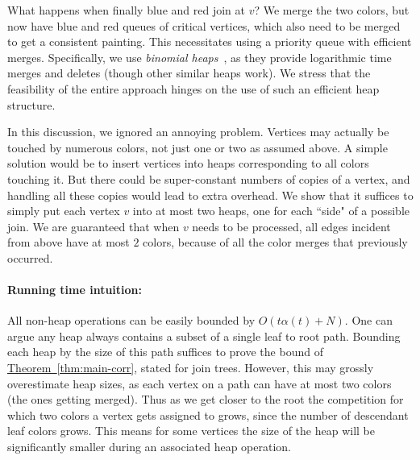 \documentclass[11pt]{article}
\newcommand{\myparagraph}[1]{\paragraph{#1}}
\theoremstyle{definition}
\newcommand{\Thm}[1]{\hyperref[thm:#1]{Theorem~\ref*{thm:#1}}} %
\begin{document}
What happens when finally blue and red join at $v$? We merge the two colors, but now have
blue and red queues of critical vertices, which also need to be merged to get a consistent painting. 
This necessitates using a priority queue with efficient merges.
Specifically, we use \emph{binomial heaps}~\cite{Vu78}, as they provide logarithmic time merges and deletes (though other similar heaps work). 
We stress that the feasibility of the entire approach hinges on the use of such an efficient heap structure.

In this discussion, we ignored an annoying problem. Vertices
may actually be touched by numerous colors, not just one or two as assumed above. A simple solution
would be to insert vertices into heaps corresponding to all colors touching it. But there could
be super-constant numbers of copies of a vertex, and handling all these copies would lead
to extra overhead. We show that it suffices to simply put each vertex $v$ into at most two heaps, one for each
``side" of a possible join. We are guaranteed that when $v$ needs to be processed, all edges incident from above have
at most $2$ colors, because of all the color merges that previously occurred.

\myparagraph{Running time intuition:} 
 All non-heap operations can be easily bounded by $O(t\alpha(t) + N)$. 
 One can argue any heap always contains a subset of a single leaf to root path.  
 Bounding each heap by the size of this path suffices to prove the bound of \Thm{main-corr}, stated for join trees. 
 However, this may grossly overestimate heap sizes, as each vertex on a path can have at most two colors (the ones getting merged).
 Thus as we get closer to the root the competition for which two colors a vertex gets assigned to grows, since the number of descendant leaf colors grows. 
 This means for some vertices the size of the heap will be significantly smaller during an associated heap operation. 
 
\end{document}

